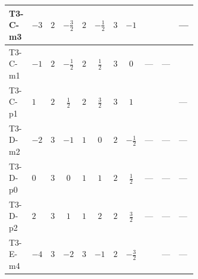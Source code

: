 \documentclass[8pt]{article}
\begin{document}
\begin{landscape}
\begin{longtable}{@{}llcccccc >{\raggedright\arraybackslash}p{0.21\linewidth} >{\raggedright\arraybackslash}p{0.21\linewidth} >{\raggedright\arraybackslash}p{0.21\linewidth}@{}}
\midrule
T3-C-m3 & $-3$ & $2$ & $-\frac{3}{2}$ & $2$ & $-\frac{1}{2}$ & $3$ & $-1$ & \scriptsize\adjustbox{max width=\linewidth}{$\begin{gathered} \frac{1}{2} (\left(\left({y_1}\right)^{T}\,\left({y_1}\right)^{*}\,{M_F}\right)_{ij}+\left({M_F}\,\left({y_2}\right)^{\dagger}\,{y_2}\right)_{ij})\end{gathered}$} & \scriptsize\adjustbox{max width=\linewidth}{$\begin{gathered} -12 {g_2}^2 \left({M_F}\right)_{ij}\end{gathered}$} & --- \\
\midrule
T3-C-m1 & $-1$ & $2$ & $-\frac{1}{2}$ & $2$ & $\frac{1}{2}$ & $3$ & $0$ & --- & --- & \scriptsize\adjustbox{max width=\linewidth}{$\begin{gathered} \frac{1}{2} (\left(\left({M_F}\right)^{T}\,\left({y_1}\right)^{\dagger}\,{y_1}\right)_{ij}+\left(\left({y_1}\right)^{T}\,\left({y_1}\right)^{*}\,{M_F}\right)_{ij}+\left(\left({M_F}\right)^{T}\,\left({y_2}\right)^{\dagger}\,{y_2}\right)_{ij}+\left(\left({y_2}\right)^{T}\,\left({y_2}\right)^{*}\,{M_F}\right)_{ij})\end{gathered}$} \\
\midrule
T3-C-p1 & $1$ & $2$ & $\frac{1}{2}$ & $2$ & $\frac{3}{2}$ & $3$ & $1$ & \scriptsize\adjustbox{max width=\linewidth}{$\begin{gathered} \frac{1}{2} (\left(\left({y_1}\right)^{T}\,\left({y_1}\right)^{*}\,{M_F}\right)_{ij}+\left({M_F}\,\left({y_2}\right)^{\dagger}\,{y_2}\right)_{ij})\end{gathered}$} & \scriptsize\adjustbox{max width=\linewidth}{$\begin{gathered} -12 {g_2}^2 \left({M_F}\right)_{ij}\end{gathered}$} & --- \\
\midrule
T3-D-m2 & $-2$ & $3$ & $-1$ & $1$ & $0$ & $2$ & $-\frac{1}{2}$ & --- & --- & --- \\
\midrule
T3-D-p0 & $0$ & $3$ & $0$ & $1$ & $1$ & $2$ & $\frac{1}{2}$ & --- & --- & --- \\
\midrule
T3-D-p2 & $2$ & $3$ & $1$ & $1$ & $2$ & $2$ & $\frac{3}{2}$ & --- & --- & --- \\
\midrule
T3-E-m4 & $-4$ & $3$ & $-2$ & $3$ & $-1$ & $2$ & $-\frac{3}{2}$ & \scriptsize\adjustbox{max width=\linewidth}{$\begin{gathered} \frac{3}{4} (\left(\left({y_1}\right)^{T}\,\left({y_1}\right)^{*}\,{M_F}\right)_{ij}+\left({M_F}\,\left({y_2}\right)^{\dagger}\,{y_2}\right)_{ij})\end{gathered}$} & --- & --- \\

\end{longtable}
\end{landscape}
\end{document}

